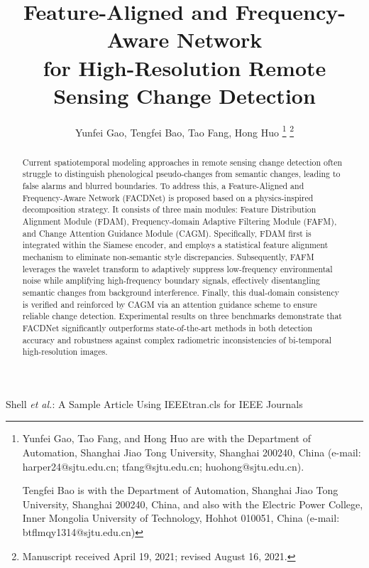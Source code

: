 \documentclass[lettersize,journal]{IEEEtran}
\begin{document}
\title{Feature-Aligned and Frequency-Aware Network \\ for High-Resolution Remote Sensing Change Detection}

\author{Yunfei Gao, Tengfei Bao, Tao Fang, Hong Huo
\thanks{Yunfei Gao, Tao Fang, and Hong Huo are with the Department of Automation, Shanghai Jiao Tong University, Shanghai 200240, China (e-mail: harper24@sjtu.edu.cn; tfang@sjtu.edu.cn; huohong@sjtu.edu.cn).

Tengfei Bao is with the Department of Automation, Shanghai Jiao Tong University, Shanghai 200240, China, and also with the Electric Power College, Inner Mongolia University of Technology, Hohhot 010051, China (e-mail: btflmqy1314@sjtu.edu.cn)}%
\thanks{Manuscript received April 19, 2021; revised August 16, 2021.}}

%
{Shell \MakeLowercase{\textit{et al.}}: A Sample Article Using IEEEtran.cls for IEEE Journals}


\maketitle

\begin{abstract}
Current spatiotemporal modeling approaches in remote sensing change detection often struggle to distinguish phenological pseudo-changes from semantic changes, leading to false alarms and blurred boundaries. To address this, a Feature-Aligned and Frequency-Aware Network (FACDNet) is proposed based on a physics-inspired decomposition strategy. It consists of three main modules: Feature Distribution Alignment Module (FDAM), Frequency-domain Adaptive Filtering Module (FAFM), and Change Attention Guidance Module (CAGM). Specifically, FDAM first is integrated within the Siamese encoder, and employs a statistical feature alignment mechanism to eliminate non-semantic style discrepancies. Subsequently, FAFM leverages the wavelet transform to adaptively suppress low-frequency environmental noise while amplifying high-frequency boundary signals, effectively disentangling semantic changes from background interference. Finally, this dual-domain consistency is verified and reinforced by CAGM via an attention guidance scheme to ensure reliable change detection. Experimental results on three benchmarks demonstrate that FACDNet significantly outperforms state-of-the-art methods in both detection accuracy and robustness against complex radiometric inconsistencies of bi-temporal high-resolution images. 

\end{abstract}
\end{document}
